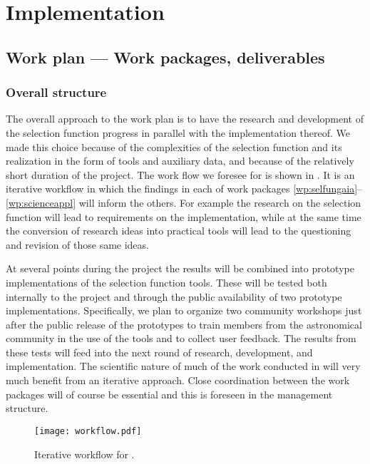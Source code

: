 \chapter{Implementation}
\label{cha:implementation}

\section{Work plan --- Work packages, deliverables}
\label{sec:work-plan}

\subsection{Overall structure}
\label{sec:wpstructure}

The overall approach to the work plan is to have the research and development of the selection function progress in parallel with the implementation thereof. We made this choice because of the complexities of the selection function and its realization in the form of tools and auxiliary data, and because of the relatively short duration of the project. The work flow we foresee for {\acro} is shown in . It is an iterative workflow in which the findings in each of work packages \ref{wp:selfungaia}--\ref{wp:scienceappl} will inform the others. For example the research on the selection function will lead to requirements on the implementation, while at the same time the conversion of research ideas into practical tools will lead to the questioning and revision of those same ideas.

At several points during the project the results will be combined into prototype implementations of the selection function tools. These will be tested both internally to the project and through the public availability of two prototype implementations. Specifically, we plan to organize two community workshops just after the public release of the prototypes to train members from the astronomical community in the use of the tools and to collect user feedback. The results from these tests will feed into the next round of research, development, and implementation. The scientific nature of much of the work conducted in {\acro} will very much benefit from an iterative approach. Close coordination between the work packages will of course be essential and this is foreseen in the management structure.

\begin{figure}
    \centering
    \texttt{[image: workflow.pdf]}
    \caption{Iterative workflow for {\acro}.}
    \label{fig:workflow}
\end{figure}

